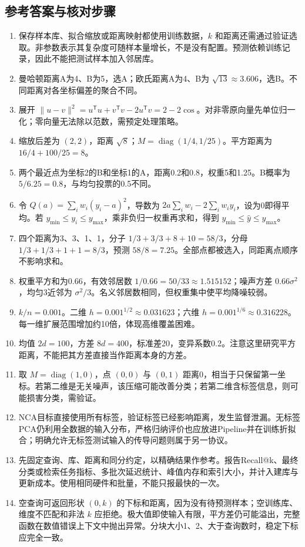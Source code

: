 \documentclass[UTF8,fontset=none,zihao=-4,a4paper]{ctexart}
\numberwithin{equation}{section}
\numberwithin{figure}{section}
\begin{document}
\clearpage
\subsection{参考答案与核对步骤}
\begin{enumerate}[label=15.\arabic*.,before={\interlinepenalty=10000}]
\item 保存样本库、拟合缩放或距离映射都使用训练数据，$k$ 和距离还需通过验证选取。非参数表示其复杂度可随样本量增长，不是没有配置。预测依赖训练记录，因此不能把测试样本加入邻居库。
\item 曼哈顿距离A为4、B为5，选A；欧氏距离A为4、B为 $\sqrt{13}\approx3.606$，选B。不同距离对各坐标偏差的聚合不同。
\item 展开 $\|u-v\|^2=u^{\mathsf T}u+v^{\mathsf T}v-2u^{\mathsf T}v=2-2\cos$。对非零原向量先单位归一化；零向量无法除以范数，需预定处理策略。
\item 缩放后差为 $(2,2)$，距离 $\sqrt8$；$M=\operatorname{diag}(1/4,1/25)$。平方距离为 $16/4+100/25=8$。
\item 两个最近点为坐标2的B和坐标1的A，距离0.2和0.8，权重5和1.25。B概率为 $5/6.25=0.8$，与均匀投票的0.5不同。
\item 令 $Q(a)=\sum_iw_i(y_i-a)^2$，导数为 $2a\sum_iw_i-2\sum_iw_iy_i$，设为0即得平均。若 $y_{\min}\le y_i\le y_{\max}$，乘非负归一权重再求和，得到 $y_{\min}\le\widehat y\le y_{\max}$。
\item 四个距离为3、3、1、1，分子 $1/3+3/3+8+10=58/3$，分母 $1/3+1/3+1+1=8/3$，预测 $58/8=7.25$。全部点都被选入，同距离点顺序不影响求和。
\item 权重平方和为0.66，有效邻居数 $1/0.66=50/33\approx1.515152$；噪声方差 $0.66\sigma^2$，均匀3近邻为 $\sigma^2/3$。名义邻居数相同，但权重集中使平均降噪较弱。
\item $k/n=0.001$。二维 $h=0.001^{1/2}\approx0.031623$；六维 $h=0.001^{1/6}\approx0.316228$。每一维扩展范围增加约10倍，体现高维覆盖困难。
\item 均值 $2d=100$，方差 $8d=400$，标准差20，变异系数0.2。注意这里研究平方距离，不能把其方差直接当作距离本身的方差。
\item 取 $M=\operatorname{diag}(1,0)$，点 $(0,0)$ 与 $(0,1)$ 距离0，相当于只保留第一坐标。若第二维是无关噪声，该压缩可能改善分类；若第二维含标签信息，则可能损害分类，需验证。
\item NCA目标直接使用所有标签，验证标签已经影响距离，发生监督泄漏。无标签PCA仍利用全数据的输入分布，严格归纳评价也应放进Pipeline并在训练折拟合；明确允许无标签测试输入的传导问题则属于另一协议。
\item 先固定查询、库、距离和同分约定，以精确结果作参考。报告Recall@k、最终分类或检索任务指标、多批次延迟统计、峰值内存和索引大小，并计入建库与更新成本。使用相同硬件和批量，不能只报最快的一次。
\item 空查询可返回形状 $(0,k)$ 的下标和距离，因为没有待预测样本；空训练库、维度不匹配和非法 $k$ 应拒绝。极大值即使输入有限，平方差仍可能溢出，完整函数在数值错误上下文中抛出异常。分块大小1、2、大于查询数时，稳定下标应完全一致。
\end{enumerate}
\end{document}

